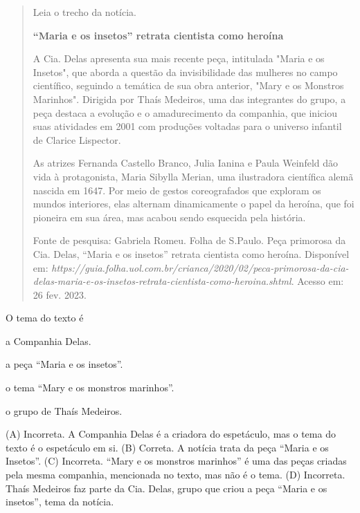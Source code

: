 \begin{quote}
Leia o trecho da notícia.

\textbf{``Maria e os insetos'' retrata cientista como heroína}

A Cia. Delas apresenta sua mais recente peça, intitulada "Maria e os Insetos", que aborda a questão da invisibilidade das mulheres no campo científico, seguindo a temática de sua obra anterior, "Mary e os Monstros Marinhos". Dirigida por Thaís Medeiros, uma das integrantes do grupo, a peça destaca a evolução e o amadurecimento da companhia, que iniciou suas atividades em 2001 com produções voltadas para o universo infantil de Clarice Lispector.

As atrizes Fernanda Castello Branco, Julia Ianina e Paula Weinfeld dão vida à protagonista, Maria Sibylla Merian, uma ilustradora científica alemã nascida em 1647. Por meio de gestos coreografados que exploram os mundos interiores, elas alternam dinamicamente o papel da heroína, que foi pioneira em sua área, mas acabou sendo esquecida pela história.

Fonte de pesquisa: Gabriela Romeu. Folha de S.Paulo. Peça primorosa da Cia. Delas, ``Maria e os insetos'' retrata cientista como heroína. Disponível em:
\emph{https://guia.folha.uol.com.br/crianca/2020/02/peca-primorosa-da-cia-delas-maria-e-os-insetos-retrata-cientista-como-heroina.shtml}.
Acesso em: 26 fev. 2023.
\end{quote}

O tema do texto é

\begin{escolha}
\item a Companhia Delas.

\item a peça ``Maria e os insetos''.

\item o tema ``Mary e os monstros marinhos''.

\item o grupo de Thaís Medeiros.
\end{escolha}


(A) Incorreta. A Companhia Delas é a criadora do espetáculo, mas o tema do texto é o espetáculo em si.
(B) Correta. A notícia trata da peça ``Maria e os Insetos''.
(C) Incorreta. ``Mary e os monstros marinhos'' é uma das peças criadas
pela mesma companhia, mencionada no texto, mas não é o tema.
(D) Incorreta. Thaís Medeiros faz parte da Cia. Delas, grupo que criou a
peça ``Maria e os insetos'', tema da notícia.

